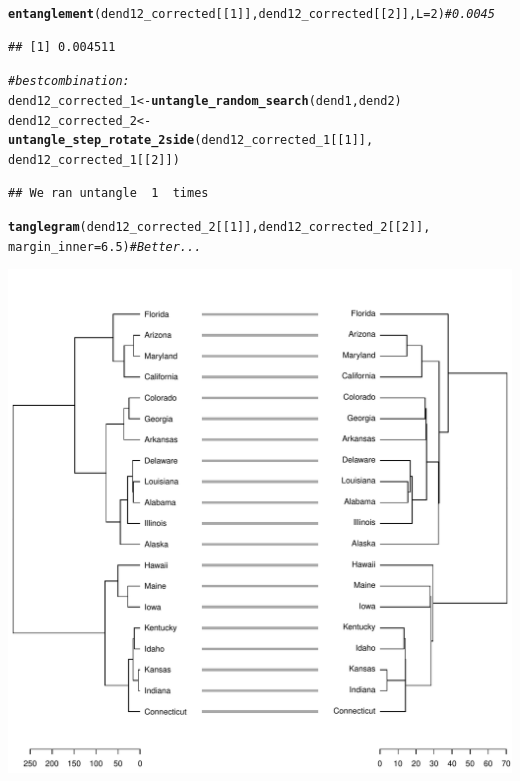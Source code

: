 \documentclass[shortnames,nojss,article]{jss}\usepackage[]{graphicx}\usepackage[]{color}
\makeatletter
\def\maxwidth{ %
  \ifdim\Gin@nat@width>\linewidth
    \linewidth
  \else
    \Gin@nat@width
  \fi
}
\newcommand{\hlnum}[1]{\textcolor[rgb]{0.686,0.059,0.569}{#1}}%
\newcommand{\hlcom}[1]{\textcolor[rgb]{0.678,0.584,0.686}{\textit{#1}}}%
\newcommand{\hlstd}[1]{\textcolor[rgb]{0.345,0.345,0.345}{#1}}%
\newcommand{\hlkwb}[1]{\textcolor[rgb]{0.69,0.353,0.396}{#1}}%
\newcommand{\hlkwc}[1]{\textcolor[rgb]{0.333,0.667,0.333}{#1}}%
\newcommand{\hlkwd}[1]{\textcolor[rgb]{0.737,0.353,0.396}{\textbf{#1}}}%
\newenvironment{kframe}{%
 \def\at@end@of@kframe{}%
 \ifinner\ifhmode%
  \def\at@end@of@kframe{\end{minipage}}%
  \begin{minipage}{\columnwidth}%
 \fi\fi%
 \def\FrameCommand##1{\hskip\@totalleftmargin \hskip-\fboxsep
 \colorbox{shadecolor}{##1}\hskip-\fboxsep
     \hskip-\linewidth \hskip-\@totalleftmargin \hskip\columnwidth}%
 \MakeFramed {\advance\hsize-\width
   \@totalleftmargin\z@ \linewidth\hsize
   \@setminipage}}%
 {\par\unskip\endMakeFramed%
 \at@end@of@kframe}
\newenvironment{knitrout}{}{} %
\makeatother
\begin{document}
\begin{knitrout}
\begin{kframe}\begin{alltt}
\hlkwd{entanglement}\hlstd{(dend12_corrected[[}\hlnum{1}\hlstd{]], dend12_corrected[[}\hlnum{2}\hlstd{]],} \hlkwc{L} \hlstd{=} \hlnum{2}\hlstd{)}  \hlcom{# 0.0045}
\end{alltt}
\begin{verbatim}
## [1] 0.004511
\end{verbatim}
\begin{alltt}
\hlcom{# best combination:}
\hlstd{dend12_corrected_1} \hlkwb{<-} \hlkwd{untangle_random_search}\hlstd{(dend1, dend2)}
\hlstd{dend12_corrected_2} \hlkwb{<-} \hlkwd{untangle_step_rotate_2side}\hlstd{(dend12_corrected_1[[}\hlnum{1}\hlstd{]],}
    \hlstd{dend12_corrected_1[[}\hlnum{2}\hlstd{]])}
\end{alltt}
\begin{verbatim}
## We ran untangle  1  times
\end{verbatim}
\begin{alltt}
\hlkwd{tanglegram}\hlstd{(dend12_corrected_2[[}\hlnum{1}\hlstd{]], dend12_corrected_2[[}\hlnum{2}\hlstd{]],}
    \hlkwc{margin_inner} \hlstd{=} \hlnum{6.5}\hlstd{)}  \hlcom{# Better...}
\end{alltt}
\end{kframe}

{\centering \includegraphics[width=\maxwidth]{figure/untangle_step_rotate_2side_example4} 

}
\end{knitrout}
\end{document}
